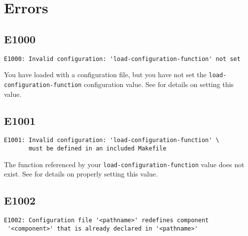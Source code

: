 %
%
%
%
\chapter{Errors}

\section{E1000}

\begin{verbatim}
E1000: Invalid configuration: 'load-configuration-function' not set
\end{verbatim}

You have loaded \lmsbw with a configuration file, but you have not set
the \texttt{load-configuration-function} configuration value.  See
 for details on setting
this value.

\section{E1001}

\begin{verbatim}
E1001: Invalid configuration: 'load-configuration-function' \
       must be defined in an included Makefile
\end{verbatim}

The function referenced by your \texttt{load-configuration-function}
value does not exist.  See  for
details on properly setting this value.

\section{E1002}

\begin{verbatim}
E1002: Configuration file '<pathname>' redefines component
 '<component>' that is already declared in '<pathname>'
\end{verbatim}

